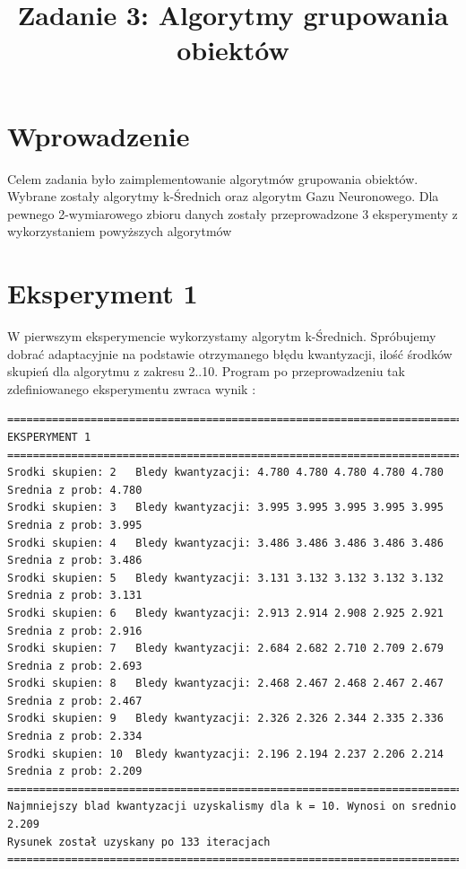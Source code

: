 \documentclass{classrep}
\author{
  \studentinfo{Natalia Mateuszuk}{203940} \and
  \studentinfo{Adrian Grzelak}{200242}
}
\title{Zadanie 3: Algorytmy grupowania obiektów}
\begin{document}
\maketitle

\section{Wprowadzenie}
Celem zadania było zaimplementowanie algorytmów grupowania obiektów. Wybrane zostały algorytmy k-Średnich oraz algorytm Gazu Neuronowego. Dla pewnego 2-wymiarowego zbioru danych zostały przeprowadzone 3 eksperymenty z wykorzystaniem powyższych algorytmów 

\section{Eksperyment 1}
W pierwszym eksperymencie wykorzystamy algorytm k-Średnich. Spróbujemy dobrać adaptacyjnie na podstawie otrzymanego błędu kwantyzacji, ilość środków skupień dla algorytmu z zakresu 2..10. Program po przeprowadzeniu tak zdefiniowanego eksperymentu zwraca wynik :
\scriptsize
\begin{verbatim}
=====================================================================================================
EKSPERYMENT 1
=====================================================================================================
Srodki skupien: 2	Bledy kwantyzacji: 4.780 4.780 4.780 4.780 4.780 	Srednia z prob: 4.780
Srodki skupien: 3	Bledy kwantyzacji: 3.995 3.995 3.995 3.995 3.995 	Srednia z prob: 3.995
Srodki skupien: 4	Bledy kwantyzacji: 3.486 3.486 3.486 3.486 3.486 	Srednia z prob: 3.486
Srodki skupien: 5	Bledy kwantyzacji: 3.131 3.132 3.132 3.132 3.132 	Srednia z prob: 3.131
Srodki skupien: 6	Bledy kwantyzacji: 2.913 2.914 2.908 2.925 2.921 	Srednia z prob: 2.916
Srodki skupien: 7	Bledy kwantyzacji: 2.684 2.682 2.710 2.709 2.679 	Srednia z prob: 2.693
Srodki skupien: 8	Bledy kwantyzacji: 2.468 2.467 2.468 2.467 2.467 	Srednia z prob: 2.467
Srodki skupien: 9	Bledy kwantyzacji: 2.326 2.326 2.344 2.335 2.336 	Srednia z prob: 2.334
Srodki skupien: 10	Bledy kwantyzacji: 2.196 2.194 2.237 2.206 2.214 	Srednia z prob: 2.209
=====================================================================================================
Najmniejszy blad kwantyzacji uzyskalismy dla k = 10. Wynosi on srednio  2.209
Rysunek został uzyskany po 133 iteracjach
=====================================================================================================
\end{verbatim}
\normalsize
\end{document}
